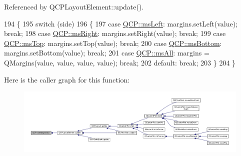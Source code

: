 Referenced by Q\+C\+P\+Layout\+Element\+::update().


\begin{DoxyCode}
194 \{
195   \textcolor{keywordflow}{switch} (side)
196   \{
197     \textcolor{keywordflow}{case} \hyperlink{namespace_q_c_p_a7e487e3e2ccb62ab7771065bab7cae54a9500c8bfcc9e80b9dff0a8e00e867f07}{QCP::msLeft}: margins.setLeft(value); \textcolor{keywordflow}{break};
198     \textcolor{keywordflow}{case} \hyperlink{namespace_q_c_p_a7e487e3e2ccb62ab7771065bab7cae54a93c719593bb2b94ed244d52c86d83b65}{QCP::msRight}: margins.setRight(value); \textcolor{keywordflow}{break};
199     \textcolor{keywordflow}{case} \hyperlink{namespace_q_c_p_a7e487e3e2ccb62ab7771065bab7cae54a5db8fb0d0b0ecf0d611c2602a348e8a0}{QCP::msTop}: margins.setTop(value); \textcolor{keywordflow}{break};
200     \textcolor{keywordflow}{case} \hyperlink{namespace_q_c_p_a7e487e3e2ccb62ab7771065bab7cae54a5241d8eac2bab9524a38889f576179cc}{QCP::msBottom}: margins.setBottom(value); \textcolor{keywordflow}{break};
201     \textcolor{keywordflow}{case} \hyperlink{namespace_q_c_p_a7e487e3e2ccb62ab7771065bab7cae54a43d7361cb0c5244eabdc962021bffebc}{QCP::msAll}: margins = QMargins(value, value, value, value); \textcolor{keywordflow}{break};
202     \textcolor{keywordflow}{default}: \textcolor{keywordflow}{break};
203   \}
204 \}
\end{DoxyCode}


Here is the caller graph for this function\+:\nopagebreak
\begin{figure}[H]
\begin{center}
\leavevmode
\includegraphics[width=350pt]{namespace_q_c_p_afbf6e3084c108f2bb4372107945ee82f_icgraph}
\end{center}
\end{figure}


